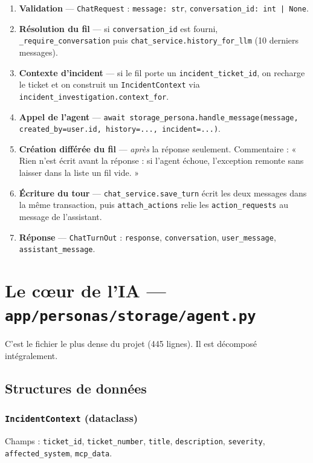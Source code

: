 \documentclass[11pt,a4paper]{report}
\newcommand{\file}[1]{\texttt{\small #1}}
\newcommand{\fn}[1]{\texttt{\small\textcolor{oasisviolet}{#1}}}
\newcommand{\cls}[1]{\texttt{\small\textcolor{oasisblue}{#1}}}
\newcommand{\tbl}[1]{\texttt{\small\textcolor{oasisamber}{#1}}}
\begin{document}
\begin{enumerate}
  \item \textbf{Validation} --- \cls{ChatRequest} : \texttt{message: str},
  \texttt{conversation\_id: int | None}.
  \item \textbf{Résolution du fil} --- si \texttt{conversation\_id} est fourni,
  \fn{\_require\_conversation} puis \fn{chat\_service.history\_for\_llm} (10
  derniers messages).
  \item \textbf{Contexte d'incident} --- si le fil porte un
  \texttt{incident\_ticket\_id}, on recharge le ticket et on construit un
  \cls{IncidentContext} via \fn{incident\_investigation.context\_for}.
  \item \textbf{Appel de l'agent} ---
  \fn{await storage\_persona.handle\_message(message, created\_by=user.id,
  history=..., incident=...)}.
  \item \textbf{Création différée du fil} --- \emph{après} la réponse
  seulement. Commentaire : « Rien n'est écrit avant la réponse : si l'agent
  échoue, l'exception remonte sans laisser dans la liste un fil vide. »
  \item \textbf{Écriture du tour} --- \fn{chat\_service.save\_turn} écrit les
  deux messages dans la même transaction, puis \fn{attach\_actions} relie les
  \tbl{action\_requests} au message de l'assistant.
  \item \textbf{Réponse} --- \cls{ChatTurnOut} : \texttt{response},
  \texttt{conversation}, \texttt{user\_message}, \texttt{assistant\_message}.
\end{enumerate}

\section{Le cœur de l'IA --- \file{app/personas/storage/agent.py}}

C'est le fichier le plus dense du projet (445 lignes). Il est décomposé
intégralement.

\subsection{Structures de données}

\subsubsection*{\cls{IncidentContext} (dataclass)}
Champs : \texttt{ticket\_id}, \texttt{ticket\_number}, \texttt{title},
\texttt{description}, \texttt{severity}, \texttt{affected\_system},
\texttt{mcp\_data}.
\end{document}
